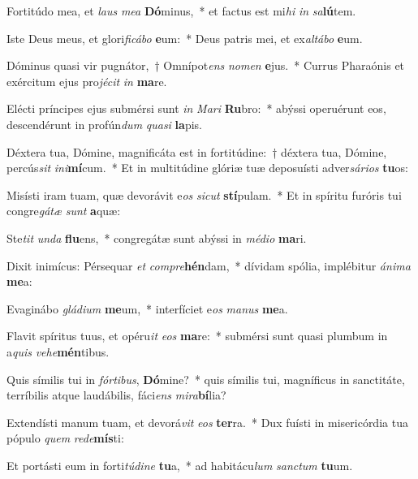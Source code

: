 \item Fortitúdo mea, et \textit{laus} \textit{me}\textit{a} \textbf{Dó}minus,~* et factus est mi\textit{hi} \textit{in} \textit{sa}\textbf{lú}tem.
\item Iste Deus meus, et glori\textit{fi}\textit{cá}\textit{bo} \textbf{e}um:~* Deus patris mei, et ex\textit{al}\textit{tá}\textit{bo} \textbf{e}um.
\item Dóminus quasi vir pugnátor,~† Omnípot\textit{ens} \textit{no}\textit{men} \textbf{e}jus.~* Currus Pharaónis et exércitum ejus pro\textit{jé}\textit{cit} \textit{in} \textbf{ma}re.
\item Elécti príncipes ejus submérsi sunt \textit{in} \textit{Ma}\textit{ri} \textbf{Ru}bro:~* abýssi operuérunt eos, descendérunt in profún\textit{dum} \textit{qua}\textit{si} \textbf{la}pis.
\item Déxtera tua, Dómine, magnificáta est in fortitúdine:~† déxtera tua, Dómine, percús\textit{sit} \textit{in}\textit{i}\textbf{mí}cum.~* Et in multitúdine glóriæ tuæ deposuísti adver\textit{sá}\textit{ri}\textit{os} \textbf{tu}os:
\item Misísti iram tuam, quæ devorávit e\textit{os} \textit{sic}\textit{ut} \textbf{stí}pulam.~* Et in spíritu furóris tui congre\textit{gá}\textit{tæ} \textit{sunt} \textbf{a}quæ:
\item Ste\textit{tit} \textit{un}\textit{da} \textbf{flu}ens,~* congregátæ sunt abýssi in \textit{mé}\textit{di}\textit{o} \textbf{ma}ri.
\item Dixit inimícus: Pérsequar \textit{et} \textit{com}\textit{pre}\textbf{hén}dam,~* dívidam spólia, implébitur \textit{á}\textit{ni}\textit{ma} \textbf{me}a:
\item Evaginábo \textit{glá}\textit{di}\textit{um} \textbf{me}um,~* interfíciet e\textit{os} \textit{ma}\textit{nus} \textbf{me}a.
\item Flavit spíritus tuus, et opéru\textit{it} \textit{e}\textit{os} \textbf{ma}re:~* submérsi sunt quasi plumbum in a\textit{quis} \textit{ve}\textit{he}\textbf{mén}tibus.
\item Quis símilis tui in \textit{fór}\textit{ti}\textit{bus}, \textbf{Dó}mine?~* quis símilis tui, magníficus in sanctitáte, terríbilis atque laudábilis, fáci\textit{ens} \textit{mi}\textit{ra}\textbf{bí}lia?
\item Extendísti manum tuam, et devorá\textit{vit} \textit{e}\textit{os} \textbf{ter}ra.~* Dux fuísti in misericórdia tua pópulo \textit{quem} \textit{red}\textit{e}\textbf{mís}ti:
\item Et portásti eum in forti\textit{tú}\textit{di}\textit{ne} \textbf{tu}a,~* ad habitácu\textit{lum} \textit{sanc}\textit{tum} \textbf{tu}um.

